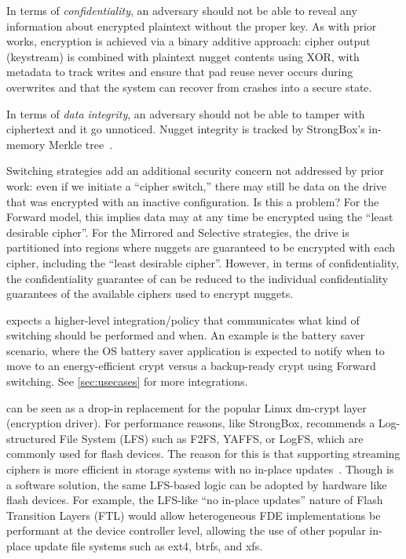  In terms of {\em confidentiality}, an
adversary should not be able to reveal any information about encrypted plaintext
without the proper key. As with prior works, encryption is achieved via a binary
additive approach: cipher output (keystream) is combined with plaintext nugget
contents using XOR, with metadata to track writes and ensure that pad reuse
never occurs during overwrites and that the system can recover from crashes into
a secure state.

In terms of {\em data integrity}, an adversary should not be able to tamper with
ciphertext and it go unnoticed. Nugget integrity is tracked by StrongBox's
in-memory Merkle tree~\cite{StrongBox}.

Switching strategies add an additional security concern not addressed by prior
work: even if we initiate a ``cipher switch,'' there may still be data on the
drive that was encrypted with an inactive configuration. Is this a problem? For
the Forward model, this implies data may at any time be encrypted using the
``least desirable cipher''. For the Mirrored and Selective strategies, the drive
is partitioned into regions where nuggets are guaranteed to be encrypted with
each cipher, including the ``least desirable cipher''. However, in terms of
confidentiality, the confidentiality guarantee of \sys can be reduced to the
individual confidentiality guarantees of the available ciphers used to encrypt
nuggets. 

 \sys expects a higher-level integration/policy
that communicates what kind of switching should be performed and when. An
example is the battery saver scenario, where the OS battery saver application is
expected to notify \sys when to move to an energy-efficient crypt versus a
backup-ready crypt using Forward switching. See \cref*{sec:usecases} for more
integrations.

 \sys can be seen as a drop-in replacement for the popular
Linux dm-crypt layer (encryption driver). For performance reasons, like
StrongBox, \sys recommends a Log-structured File System (LFS) such as F2FS,
YAFFS, or LogFS, which are commonly used for flash devices. The reason for this
is that supporting streaming ciphers is more efficient in storage systems with
no in-place updates~\cite{StrongBox}. Though \sys is a software solution, the
same LFS-based logic can be adopted by hardware like flash devices. For example,
the LFS-like ``no in-place updates'' nature of Flash Transition Layers (FTL)
would allow heterogeneous FDE implementations be performant at the device
controller level, allowing the use of other popular in-place update file systems
such as ext4, btrfs, and xfs.
